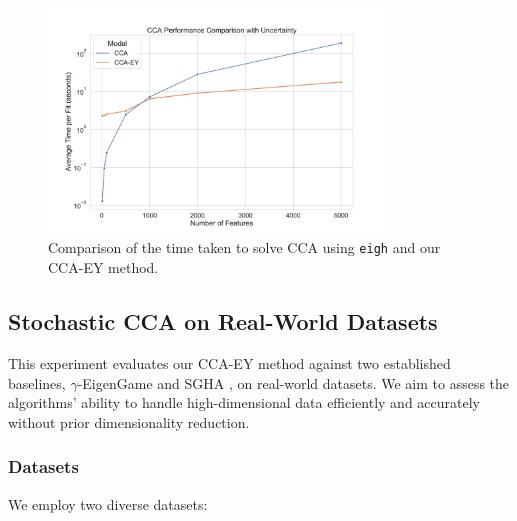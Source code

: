 \begin{figure}
    \centering
    \includegraphics[width=0.8\textwidth]{figures/benchmarks/cca_comparison_log}
    \caption{Comparison of the time taken to solve CCA using \texttt{eigh} and our CCA-EY method.}
    \label{fig:cca-comparison}
\end{figure}

\subsection{Stochastic CCA on Real-World Datasets}
This experiment evaluates our CCA-EY method against two established baselines, $\gamma$-EigenGame \citep{gemp2022generalized} and SGHA \citep{chen2019constrained}, on real-world datasets. We aim to assess the algorithms' ability to handle high-dimensional data efficiently and accurately without prior dimensionality reduction.

\subsubsection{Datasets}
We employ two diverse datasets:

